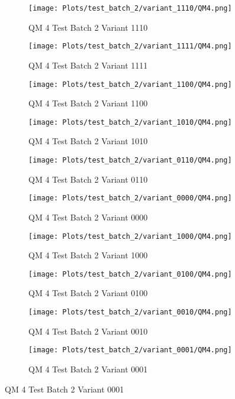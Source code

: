 \documentclass{DissertateFigs}
\begin{document}
\begin{figure}[t!]
    \begin{subfigure}{0.47\textwidth}
    \texttt{[image: Plots/test\_batch\_2/variant\_1110/QM4.png]}
    \caption{QM 4 Test Batch 2 Variant 1110}
    \end{subfigure}
    \begin{subfigure}{0.47\textwidth}
    \texttt{[image: Plots/test\_batch\_2/variant\_1111/QM4.png]}
    \caption{QM 4 Test Batch 2 Variant 1111}
    \end{subfigure}

\medskip

    \begin{subfigure}{0.47\textwidth}
    \texttt{[image: Plots/test\_batch\_2/variant\_1100/QM4.png]}
    \caption{QM 4 Test Batch 2 Variant 1100}
    \end{subfigure}
    \begin{subfigure}{0.47\textwidth}
    \texttt{[image: Plots/test\_batch\_2/variant\_1010/QM4.png]}
    \caption{QM 4 Test Batch 2 Variant 1010}
    \end{subfigure}

\medskip

    \begin{subfigure}{0.47\textwidth}
    \texttt{[image: Plots/test\_batch\_2/variant\_0110/QM4.png]}
    \caption{QM 4 Test Batch 2 Variant 0110}
    \end{subfigure}
    \begin{subfigure}{0.47\textwidth}
    \texttt{[image: Plots/test\_batch\_2/variant\_0000/QM4.png]}
    \caption{QM 4 Test Batch 2 Variant 0000}
    \end{subfigure}

\medskip

    \begin{subfigure}{0.47\textwidth}
    \texttt{[image: Plots/test\_batch\_2/variant\_1000/QM4.png]}
    \caption{QM 4 Test Batch 2 Variant 1000}
    \end{subfigure}
    \begin{subfigure}{0.47\textwidth}
    \texttt{[image: Plots/test\_batch\_2/variant\_0100/QM4.png]}
    \caption{QM 4 Test Batch 2 Variant 0100}
    \end{subfigure}

\medskip

    \begin{subfigure}{0.47\textwidth}
    \texttt{[image: Plots/test\_batch\_2/variant\_0010/QM4.png]}
    \caption{QM 4 Test Batch 2 Variant 0010}
    \end{subfigure}
    \begin{subfigure}{0.47\textwidth}
    \texttt{[image: Plots/test\_batch\_2/variant\_0001/QM4.png]}
    \caption{QM 4 Test Batch 2 Variant 0001}
    \end{subfigure}


\end{figure}
\end{document}
